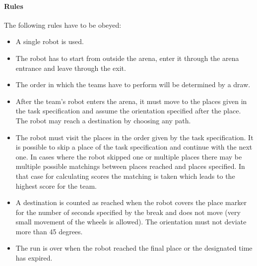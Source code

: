 \paragraph{Rules}
The following rules have to be obeyed:

\begin{itemize}
\item A single robot is used.
\item The robot has to start from outside the arena, enter it through the arena entrance and leave through the exit.
\item The order in which the teams have to perform will be determined by a draw.
\item After the team's robot enters the arena, it must move to the places given in the task specification and assume the orientation specified after the place. The robot may reach a destination by choosing any path.
\item The robot must visit the places in the order given by the task specification. It is possible to skip a place of the task specification and continue with the next one. In cases where the robot skipped one or multiple places there may be multiple possible matchings between places reached and places specified. In that case for calculating scores the matching is taken which leads to the highest score for the team.
\item A destination is counted as reached when the robot covers the place marker for the number of seconds specified by the break and does not move (very small movement of the wheels is allowed). The orientation must not deviate more than 45 degrees.
\item The run is over when the robot reached the final place or the designated time has expired.
\end{itemize}
%
%
%
%
